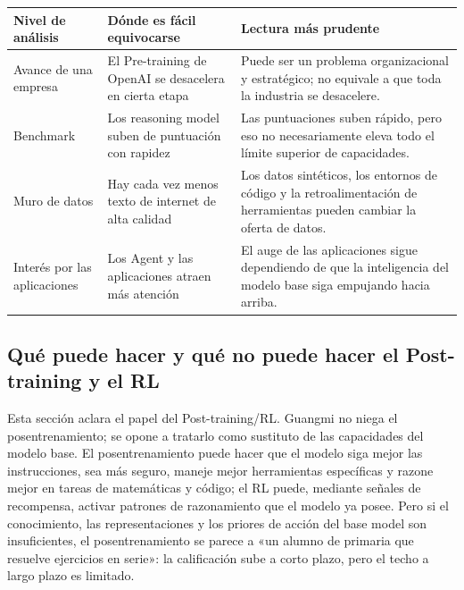 \documentclass[a4paper]{article}
\begin{document}
\noindent\begin{tabularx}{\textwidth}{p{}p{}X}
\toprule
Nivel de análisis & Dónde es fácil equivocarse & Lectura más prudente \\
\midrule
Avance de una empresa & El Pre-training de OpenAI se desacelera en cierta etapa & Puede ser un problema organizacional y estratégico; no equivale a que toda la industria se desacelere. \\
Benchmark & Los reasoning model suben de puntuación con rapidez & Las puntuaciones suben rápido, pero eso no necesariamente eleva todo el límite superior de capacidades. \\
Muro de datos & Hay cada vez menos texto de internet de alta calidad & Los datos sintéticos, los entornos de código y la retroalimentación de herramientas pueden cambiar la oferta de datos. \\
Interés por las aplicaciones & Los Agent y las aplicaciones atraen más atención & El auge de las aplicaciones sigue dependiendo de que la inteligencia del modelo base siga empujando hacia arriba. \\
\bottomrule
\end{tabularx}

\subsection{Qué puede hacer y qué no puede hacer el Post-training y el RL}

Esta sección aclara el papel del Post-training/RL. Guangmi no niega el posentrenamiento; se opone a tratarlo como sustituto de las capacidades del modelo base. El posentrenamiento puede hacer que el modelo siga mejor las instrucciones, sea más seguro, maneje mejor herramientas específicas y razone mejor en tareas de matemáticas y código; el RL puede, mediante señales de recompensa, activar patrones de razonamiento que el modelo ya posee. Pero si el conocimiento, las representaciones y los priores de acción del base model son insuficientes, el posentrenamiento se parece a «un alumno de primaria que resuelve ejercicios en serie»: la calificación sube a corto plazo, pero el techo a largo plazo es limitado.
\end{document}
